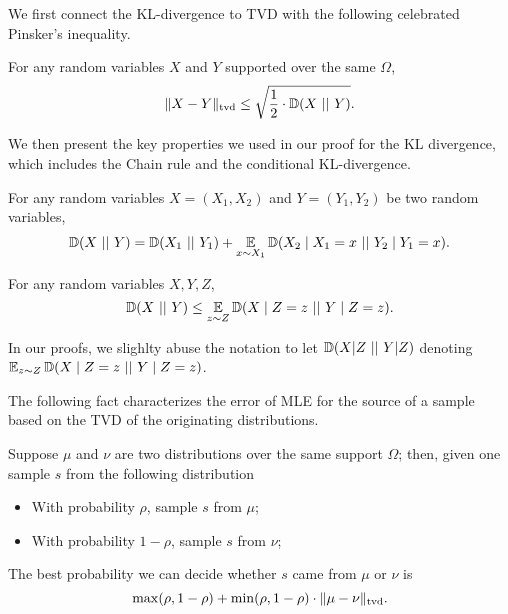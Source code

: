 We first connect the KL-divergence to TVD with the following celebrated Pinsker's inequality. 

\begin{fact}
	\label{fact:pinsker}
	For any random variables $X$ and $Y$ supported over the same $\Omega$, 
	\begin{align*}
		\|X - Y\|_{\mathrm{tvd}} \leq \sqrt{\frac{1}{2}\cdot \mathbb{D}(X~||~Y)}.
	\end{align*}
\end{fact} 

We then present the key properties we used in our proof for the KL divergence, which includes the Chain rule and the conditional KL-divergence.
\begin{fact}
	\label{fact:kl-chain-rule}
	For any random variables $X=(X_{1}, X_{2})$ and $Y=(Y_{1},Y_{2})$ be two random variables, 
	\begin{align*}
		\mathbb{D}(X~||~Y) = \mathbb{D}(X_{1}~||~Y_{1}) + \operatorname*{{\mathbb{E}}}_{x \sim X_1} \mathbb{D}(X_{2}\mid X_{1}=x~||~Y_{2}\mid Y_{1}=x).
	\end{align*}
\end{fact}


\begin{fact}\label{fact:kl-conditioning}
	For any random variables $X,Y,Z$, 
	\[
	\mathbb{D}(X~||~Y) \leq \operatorname*{{\mathbb{E}}}_{z \sim Z} \mathbb{D}(X \mid Z=z~||~Y \mid Z=z). 
	\]
\end{fact}

In our proofs, we slighlty abuse the notation to let $\mathbb{D}(X|Z~||~Y|Z)$ denoting $\operatorname*{{\mathbb{E}}}_{z \sim Z} \mathbb{D}(X \mid Z=z~||~Y \mid Z=z)$.

The following fact characterizes the error of MLE for the source of a sample based on the TVD of the originating distributions. 

\begin{fact}
	\label{fact:distinguish-tvd}
	Suppose $\mu$ and $\nu$ are two distributions over the same support $\Omega$; then, given one sample $s$ from the following distribution
	\begin{itemize}
		\item With probability $\rho$, sample $s$ from $\mu$;
		\item With probability $1-\rho$, sample $s$ from $\nu$;
	\end{itemize}
	The best probability we can decide whether $s$ came from $\mu$ or $\nu$ 
	is 
	\[
	\max(\rho, 1-\rho) + \min(\rho, 1-\rho)\cdot\|\mu - \nu\|_{\mathrm{tvd}}.
	\]
\end{fact}


